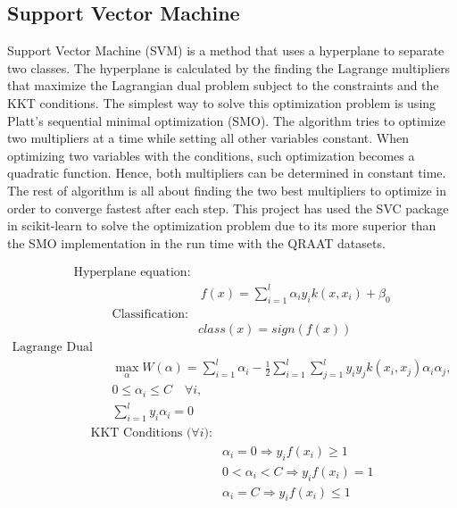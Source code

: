 \documentclass[twoside]{article}
\begin{document}
\subsection{Support Vector Machine}
Support Vector Machine (SVM) is a method that uses a hyperplane to separate two classes. The hyperplane is calculated by the finding the Lagrange multipliers that maximize the Lagrangian dual problem subject to the constraints and the KKT conditions. The simplest way to solve this optimization problem is using Platt's sequential minimal optimization (SMO). The algorithm tries to optimize two multipliers at a time while setting all other variables constant. When optimizing two variables with the conditions, such optimization becomes a quadratic function. Hence, both multipliers can be determined in constant time. The rest of algorithm is all about finding the two best multipliers to optimize in order to converge fastest after each step. This project has used the SVC package in scikit-learn to solve the optimization problem due to its more superior than the SMO implementation in the run time with the QRAAT datasets.

\begin{align*}
\text{Hyperplane equation:}&\\
&f(x) = \sum\limits_{i=1}^{l}\alpha_iy_ik(x,x_i)+\beta_0
\end{align*}
\begin{align*}
\text{Classification:}&\\
&class(x) = sign(f(x))
\end{align*}
\begin{align*}
\text{Lagrange Dual Problem:}&\\
&\max\limits_{\alpha}^{}  W(\alpha) = \sum\limits_{i=1}^{l} \alpha_i-\frac{1}{2} \sum\limits_{i=1}^{l} \sum\limits_{j=1}^{l}y_iy_jk(x_i,x_j)\alpha_i\alpha_j,\\
&0\leq\alpha_i\leq C \quad \forall i,\\
&\sum\limits_{i=1}^{l}y_i\alpha_i=0
\end{align*}
\begin{align*}
\text{KKT Conditions (}\forall i\text{):}&\\
&\alpha_i=0\Rightarrow y_if(x_i) \geq 1\\
&0<\alpha_i<C\Rightarrow y_if(x_i) = 1\\
&\alpha_i=C\Rightarrow y_if(x_i) \leq 1
\end{align*}
\end{document}
